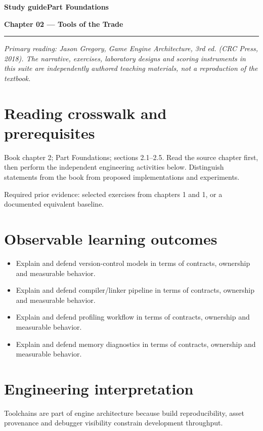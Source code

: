 \documentclass[11pt,letterpaper]{article}
\newcommand{\DocType}{Reference}
\newcommand{\SuiteHeading}[3]{%
\renewcommand{\DocType}{#2}%
{\small\bfseries\sffamily\color{EngineTeal}#2\hfill #3}\par\vspace{6pt}
{\LARGE\bfseries\color{EngineBlue}#1}\par\vspace{4pt}
{\color{EngineTeal}\rule{\linewidth}{1pt}}\par\vspace{7pt}}
\newcommand{\SourceNote}{\footnotesize\textit{Primary reading: Jason Gregory, \emph{Game Engine Architecture}, 3rd ed. (CRC Press, 2018). The narrative, exercises, laboratory designs and scoring instruments in this suite are independently authored teaching materials, not a reproduction of the textbook.}\normalsize\par}
\begin{document}
\SuiteHeading{Chapter 02 — Tools of the Trade}{Study guide}{Part Foundations}
\SourceNote
\section{Reading crosswalk and prerequisites}
Book chapter 2; Part Foundations; sections 2.1--2.5. Read the source chapter first, then perform the independent engineering activities below. Distinguish statements from the book from proposed implementations and experiments.

Required prior evidence: selected exercises from chapters 1 and 1, or a documented equivalent baseline.

\section{Observable learning outcomes}
\begin{itemize}
\item Explain and defend version-control models in terms of contracts, ownership and measurable behavior.
\item Explain and defend compiler/linker pipeline in terms of contracts, ownership and measurable behavior.
\item Explain and defend profiling workflow in terms of contracts, ownership and measurable behavior.
\item Explain and defend memory diagnostics in terms of contracts, ownership and measurable behavior.
\end{itemize}
\section{Engineering interpretation}
Toolchains are part of engine architecture because build reproducibility, asset provenance and debugger visibility constrain development throughput.
\end{document}
